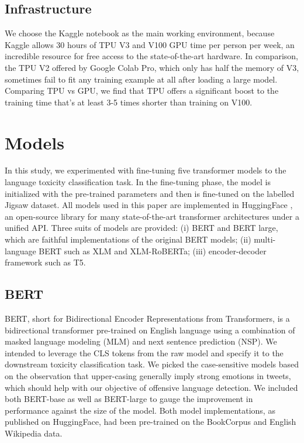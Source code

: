 \documentclass[11pt,a4paper]{article}
\begin{document}
\subsection{Infrastructure}
We choose the Kaggle notebook as the main working environment, because Kaggle allows 30 hours of TPU V3 and V100 GPU time per person per week, an incredible resource for free access to the state-of-the-art hardware. In comparison, the TPU V2 offered by Google Colab Pro, which only has half the memory of V3, sometimes fail to fit any training example at all after loading a large model. Comparing TPU vs GPU, we find that TPU offers a significant boost to the training time that’s at least 3-5 times shorter than training on V100.

\section{Models}
In this study, we experimented with fine-tuning five transformer models to the language toxicity classification task. In the fine-tuning phase, the model is initialized with the pre-trained parameters and then is fine-tuned on the labelled Jigsaw dataset. All models used in this paper are implemented in HuggingFace \citep{wolf2019huggingfaces}, an open-source library for many state-of-the-art transformer architectures under a unified API. Three suits of models are provided: (i) BERT and BERT large, which are faithful implementations of the original BERT models; (ii) multi-language BERT such as XLM and XLM-RoBERTa; (iii) encoder-decoder framework such as T5. 

\subsection{BERT}
BERT, short for Bidirectional Encoder Representations from Transformers, is a bidirectional transformer pre-trained on English language using a combination of masked language modeling (MLM) and next sentence prediction (NSP). We intended to leverage the CLS tokens from the raw model and specify it to the downstream toxicity classification task. We picked the case-sensitive models based on the observation that upper-casing generally imply strong emotions in tweets, which should help with our objective of offensive language detection. We included both BERT-base as well as BERT-large to gauge the improvement in performance against the size of the model. Both model implementations, as published on HuggingFace, had been pre-trained on the BookCorpus and English Wikipedia data.
\end{document}
